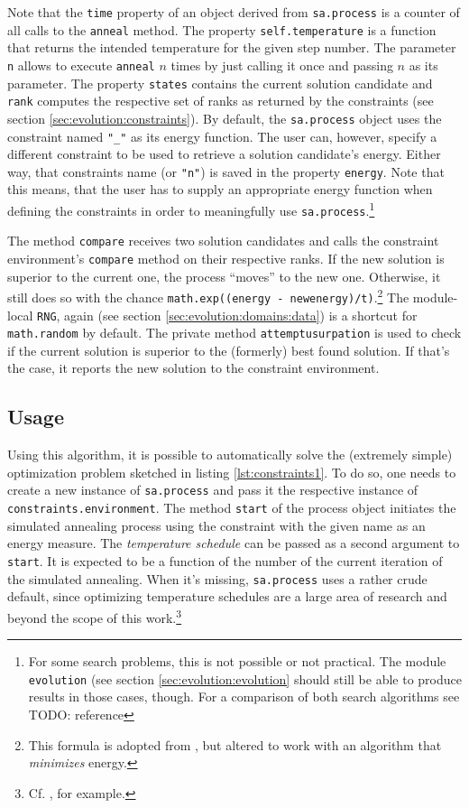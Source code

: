Note that the \texttt{time} property of an object derived from \texttt{sa.process} is a counter of all calls to the \texttt{anneal} method. The property \texttt{self.temperature} is a function that returns the intended temperature for the given step number. The parameter \texttt{n} allows to execute \texttt{anneal} $n$ times by just calling it once and passing $n$ as its parameter. The property \texttt{states} contains the current solution candidate and \texttt{rank} computes the respective set of ranks as returned by the constraints (see section \ref{sec:evolution:constraints}). By default, the \texttt{sa.process} object uses the constraint named \texttt{"\_"} as its energy function. The user can, however, specify a different constraint to be used to retrieve a solution candidate's energy. Either way, that constraints name (or \texttt{"n"}) is saved in the property \texttt{energy}. Note that this means, that the user has to supply an appropriate energy function when defining the constraints in order to meaningfully use \texttt{sa.process}.\footnote{For some search problems, this is not possible or not practical. The module \texttt{evolution} (see section \ref{sec:evolution:evolution} should still be able to produce results in those cases, though. For a comparison of both search algorithms see TODO: reference}

The method \texttt{compare} receives two solution candidates and calls the constraint environment's \texttt{compare} method on their respective ranks. If the new solution is superior to the current one, the process ``moves'' to the new one. Otherwise, it still does so with the chance \texttt{math.exp((energy - newenergy)/t)}.\footnote{This formula is adopted from \cite{RussellNorvig2003}, but altered to work with an algorithm that \emph{minimizes} energy.} The module-local \texttt{RNG}, again (see section \ref{sec:evolution:domains:data}) is a shortcut for \texttt{math.random} by default. The private method \texttt{attemptusurpation} is used to check if the current solution is superior to the (formerly) best found solution. If that's the case, it reports the new solution to the constraint environment.

\subsection{Usage}

Using this algorithm, it is possible to automatically solve the (extremely simple) optimization problem sketched in listing \ref{lst:constraints1}. To do so, one needs to create a new instance of \texttt{sa.process} and pass it the respective instance of \texttt{constraints.environment}. The method \texttt{start} of the process object initiates the simulated annealing process using the constraint with the given name as an energy measure. The \emph{temperature schedule} can be passed as a second argument to \texttt{start}. It is expected to be a function of the number of the current iteration of the simulated annealing. When it's missing, \texttt{sa.process} uses a rather crude default, since optimizing temperature schedules are a large area of research and beyond the scope of this work.\footnote{Cf. \cite{Lam88}, for example.}

